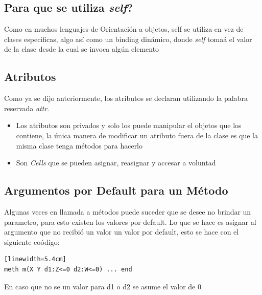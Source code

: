 \documentclass[10pt,journal,compsoc]{IEEEtran}
\begin{document}
\subsection{\textquestiondown Para que se utiliza \emph{self}?}
Como en muchos lenguajes de Orientaci\'on a objetos, self se utiliza en vez de clases especificas, algo así como un binding din\'amico, donde \emph{self} toma\'a el valor de la clase desde la cual se invoca alg\'un elemento

\subsection{Atributos}
Como ya se dijo anteriormente, los atributos se declaran utilizando la palabra reservada \emph{attr}.
\begin{itemize}
	\item Los atributos son privados y solo los puede manipular el objetos que los contiene, la \'unica manera de modificar un atributo fuera de la clase es que la misma clase tenga m\'etodos para hacerlo
	\item Son \emph{Cells} que se pueden asignar, reasignar y accesar a voluntad
\end{itemize}

\subsection{Argumentos por Default para un M\'etodo}
\par Algunas veces en llamada a m\'etodos puede suceder que se desee no brindar un parametro, para esto existen los valores por default. Lo que se hace es asignar al argumento que no recibi\'o un valor un valor por default, esto se hace con el siguiente co\'odigo:
\begin{lstlisting}[language=Oz, caption = {Variables en un scope}][linewidth=5.4cm]
meth m(X Y d1:Z<=0 d2:W<=0) ... end
\end{lstlisting}
En caso que no se un valor para d1 o d2 se asume el valor de 0
\end{document}
